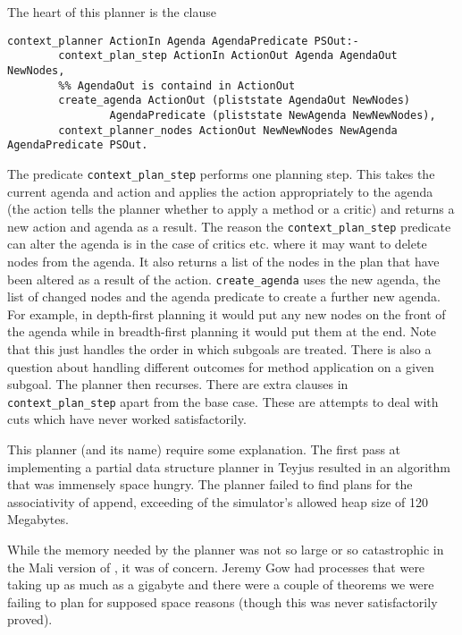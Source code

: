The heart of this planner is the clause
\begin{verbatim}
context_planner ActionIn Agenda AgendaPredicate PSOut:-
        context_plan_step ActionIn ActionOut Agenda AgendaOut NewNodes,
        %% AgendaOut is containd in ActionOut
        create_agenda ActionOut (pliststate AgendaOut NewNodes) 
                AgendaPredicate (pliststate NewAgenda NewNewNodes),
        context_planner_nodes ActionOut NewNewNodes NewAgenda AgendaPredicate PSOut.
\end{verbatim}
The predicate {\tt context\_plan\_step}
performs one planning step.  This takes the current
agenda and action and applies the action
appropriately to the agenda (the action tells the planner whether to
apply a method or a critic) and returns a new action and agenda as a
result.  The reason the {\tt context\_plan\_step} predicate can alter
the agenda is in the case of critics etc. where it may
want to delete nodes from the agenda.  It also returns a list of the
nodes in the plan that have been altered as a result of the action.
{\tt create\_agenda} uses the new agenda, the
list of changed nodes and the agenda predicate to create a further new
agenda.  For example, in depth-first planning it
would put any new nodes on the front of the agenda while in
breadth-first planning it would put them at the end.  Note that this
just handles the order in which subgoals are treated.  There is also a
question about handling different outcomes for method application on a
given subgoal.  The planner then recurses.  There are extra clauses in
{\tt context\_plan\_step} apart from the base case.  These are
attempts to deal with cuts which have never worked satisfactorily.

This planner (and its name) require some explanation.  The first pass
at implementing a partial data structure planner in
Teyjus resulted in an algorithm that was immensely space
hungry.  The planner failed to find plans for the
associativity of append, exceeding of
the simulator's allowed heap size of 120 Megabytes.

While the memory needed by the planner was not so large
or so catastrophic in the Mali version of \lclam, it was of concern.
Jeremy Gow had processes that were taking up as much as a gigabyte and
there were a couple of theorems we were failing to plan for supposed
space reasons (though this was never satisfactorily proved).

